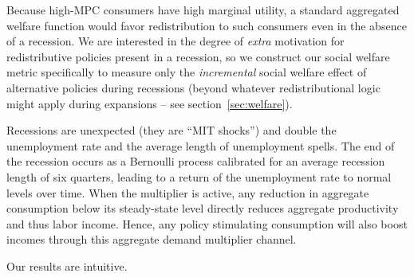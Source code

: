 \documentclass[\econtexRoot/HAFiscal]{subfiles}
\begin{document}
Because high-MPC consumers have high marginal utility, a standard aggregated welfare function would favor redistribution to such consumers even in the absence of a recession. We are interested in the degree of \textit{extra} motivation for redistributive policies present in a recession, so we construct our social welfare metric specifically to measure only the \textit{incremental} social welfare effect of alternative policies during recessions (beyond whatever redistributional logic might apply during expansions -- see section~\ref{sec:welfare}).


Recessions are unexpected (they are ``MIT shocks'') and double the unemployment rate and the average length of unemployment spells. The end of the recession occurs as a Bernoulli process calibrated for an average recession length of six quarters, leading to a return of the unemployment rate to normal levels over time. When the multiplier is active, any reduction in aggregate consumption below its steady-state level directly reduces aggregate productivity and thus labor income. Hence, any policy stimulating consumption will also boost incomes through this aggregate demand multiplier channel.


Our results are intuitive. 
\end{document}
